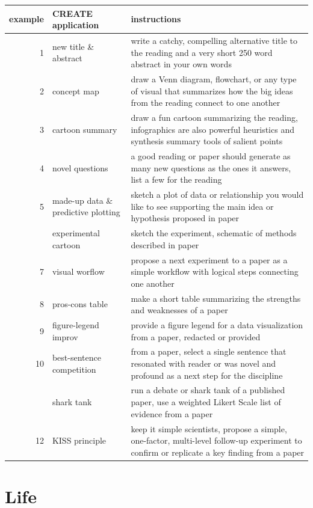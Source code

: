 \documentclass[
]{book}
\begin{document}
\begin{tabular}{rll}
\toprule
example & CREATE application & instructions\\
\midrule
1 & new title \& abstract & write a catchy, compelling alternative title to the reading and a very short 250 word abstract in your own words\\
2 & concept map & draw a Venn diagram, flowchart, or any type of visual that summarizes how the big ideas from the reading connect to one another\\
3 & cartoon summary & draw a fun cartoon summarizing the reading, infographics are also powerful heuristics and synthesis summary tools of salient points\\
4 & novel questions & a good reading or paper should generate as many new questions as the ones it answers, list a few for the reading\\
5 & made-up data \& predictive plotting & sketch a plot of data or relationship you would like to see supporting the main idea or hypothesis proposed in paper\\
\addlinespace
6 & experimental cartoon & sketch the experiment, schematic of methods described in paper\\
7 & visual worflow & propose a next experiment to a paper as a simple workflow with logical steps connecting one another\\
8 & pros-cons table & make a short table summarizing the strengths and weaknesses of a paper\\
9 & figure-legend improv & provide a figure legend for a data visualization from a paper, redacted or provided\\
10 & best-sentence competition & from a paper, select a single sentence that resonated with reader or was novel and profound as a next step for the discipline\\
\addlinespace
11 & shark tank & run a debate or shark tank of a published paper, use a weighted Likert Scale list of evidence from a paper\\
12 & KISS principle & keep it simple scientists, propose a simple, one-factor, multi-level follow-up experiment to confirm or replicate a key finding from a paper\\
\bottomrule
\end{tabular}

\hypertarget{life}{%
\chapter{Life}\label{life}}
\end{document}
